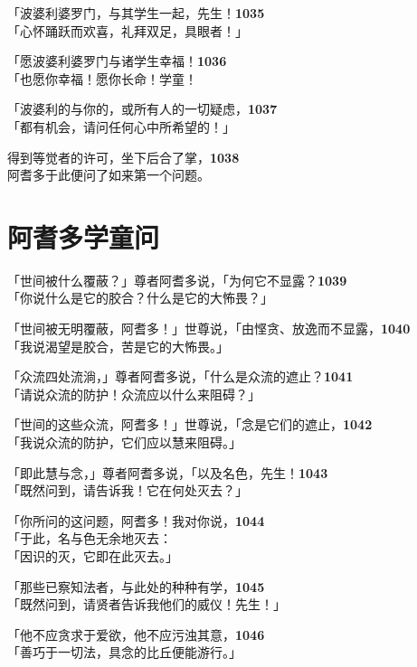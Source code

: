 「波婆利婆罗门，与其学生一起，先生！\hfill{\grayfootnotesize \textbf{1035}} \\
「心怀踊跃而欢喜，礼拜双足，具眼者！」


「愿波婆利婆罗门与诸学生幸福！\hfill{\grayfootnotesize \textbf{1036}} \\
「也愿你幸福！愿你长命！学童！


「波婆利的与你的，或所有人的一切疑虑，\hfill{\grayfootnotesize \textbf{1037}} \\
「都有机会，请问任何心中所希望的！」


得到等觉者的许可，坐下后合了掌，\hfill{\grayfootnotesize \textbf{1038}} \\
阿耆多于此便问了如来第一个问题。


\section{阿耆多学童问}

「世间被什么覆蔽？」尊者阿耆多说，「为何它不显露？\hfill{\grayfootnotesize \textbf{1039}} \\
「你说什么是它的胶合？什么是它的大怖畏？」


「世间被无明覆蔽，阿耆多！」世尊说，「由悭贪、放逸而不显露，\hfill{\grayfootnotesize \textbf{1040}} \\
「我说渴望是胶合，苦是它的大怖畏。」


「众流四处流淌，」尊者阿耆多说，「什么是众流的遮止？\hfill{\grayfootnotesize \textbf{1041}} \\
「请说众流的防护！众流应以什么来阻碍？」


「世间的这些众流，阿耆多！」世尊说，「念是它们的遮止，\hfill{\grayfootnotesize \textbf{1042}} \\
「我说众流的防护，它们应以慧来阻碍。」


「即此慧与念，」尊者阿耆多说，「以及名色，先生！\hfill{\grayfootnotesize \textbf{1043}} \\
「既然问到，请告诉我！它在何处灭去？」


「你所问的这问题，阿耆多！我对你说，\hfill{\grayfootnotesize \textbf{1044}} \\
「于此，名与色无余地灭去：\\
「因识的灭，它即在此灭去。」


「那些已察知法者，与此处的种种有学，\hfill{\grayfootnotesize \textbf{1045}} \\
「既然问到，请贤者告诉我他们的威仪！先生！」


「他不应贪求于爱欲，他不应污浊其意，\hfill{\grayfootnotesize \textbf{1046}} \\
「善巧于一切法，具念的比丘便能游行。」


